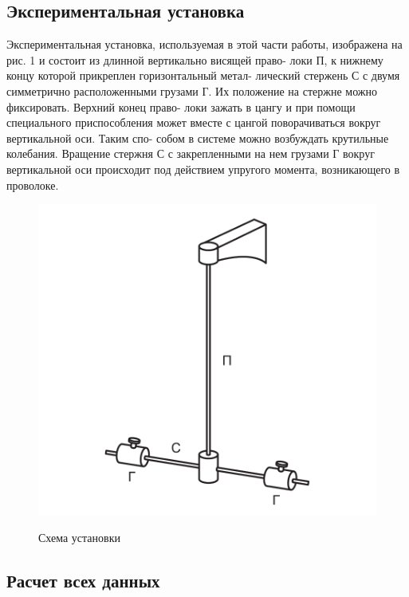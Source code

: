 \documentclass[a4paper]{article}
\begin{document}
\subsection{Экспериментальная установка}

Экспериментальная установка, используемая в этой части работы,
изображена на рис. 1 и состоит из длинной вертикально висящей право-
локи П, к нижнему концу которой прикреплен горизонтальный метал-
лический стержень С с двумя симметрично расположенными грузами
Г. Их положение на стержне можно фиксировать. Верхний конец право-
локи зажать в цангу и при помощи специального приспособления может
вместе с цангой поворачиваться вокруг вертикальной оси. Таким спо-
собом в системе можно возбуждать крутильные колебания. Вращение
стержня С с закрепленными на нем грузами Г вокруг вертикальной
оси происходит под действием упругого момента, возникающего в проволоке.

\begin{figure}[!h]
    \begin{center}
        \includegraphics[scale=0.7]{ystanovka2.png}
        \begin{center}
        \caption{Схема установки}
        \end{center}
        \label{graphic1b}
    \end{center}
\end{figure}

\newpage
\subsection{Расчет всех данных}
\end{document}
